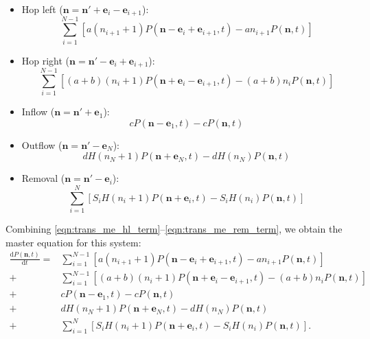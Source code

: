 \documentclass[a4paper,11pt]{article}
\numberwithin{equation}{section}
\newcommand{\diff}[2]{\frac{\mathrm{d} #1}{\mathrm{d} #2}}
\newcommand{\V}[1]{\mathbf{#1}}
\begin{document}
\begin{itemize}
    \item Hop left (\(\V{n} = \V{n}' + \V{e}_i - \V{e}_{i+1}\)):
        \begin{equation}
            \label{eqn:trans_me_hl_term}
            \sum_{i=1}^{N-1} \left[a(n_{i+1}+1) P(\V{n} - \V{e}_i +
                \V{e}_{i+1},t) - a n_{i+1} P(\V{n},t) \right]
        \end{equation}
    \item Hop right (\(\V{n} = \V{n}' - \V{e}_i + \V{e}_{i+1}\)):
        \begin{equation}
            \label{eqn:trans_me_hr_term}
            \sum_{i=1}^{N-1} \left[(a+b)(n_i+1) P(\V{n} + \V{e}_i -
                \V{e}_{i+1},t) - (a+b)n_i P(\V{n},t) \right]
        \end{equation}
    \item Inflow (\(\V{n} = \V{n}' + \V{e}_1\)):
        \begin{equation}
            \label{eqn:trans_me_in_term}
            cP(\V{n} - \V{e}_1,t) - c P(\V{n},t)
        \end{equation}
    \item Outflow (\(\V{n} = \V{n}' - \V{e}_N\)):
        \begin{equation}
            \label{eqn:trans_me_out_term}
            d H(n_N + 1) P(\V{n} + \V{e}_N,t) - d H(n_N) P(\V{n},t)
        \end{equation}
    \item Removal (\(\V{n} = \V{n}' - \V{e}_i\)):
        \begin{equation}
            \label{eqn:trans_me_rem_term}
            \sum_{i=1}^N \left[ S_i H(n_i + 1) P(\V{n} + \V{e}_i,t) - S_i H(n_i) P(\V{n},t)
                \right]
        \end{equation}
\end{itemize}

Combining \eqref{eqn:trans_me_hl_term}--\eqref{eqn:trans_me_rem_term}, we
obtain the master equation for this system:
\begin{equation}
    \label{eqn:trans_me}
    \begin{split}
        \diff{P(\V{n},t)}{t} = &
            \sum_{i=1}^{N-1} \left[a(n_{i+1}+1) P(\V{n} - \V{e}_i +
                \V{e}_{i+1},t) - a n_{i+1} P(\V{n},t) \right]\\
            +&\sum_{i=1}^{N-1} \left[(a+b)(n_i+1) P(\V{n} + \V{e}_i -
                \V{e}_{i+1},t) - (a+b)n_i P(\V{n},t) \right]\\
            +&cP(\V{n} - \V{e}_1,t) - c P(\V{n},t)\\
            +&d H(n_N + 1) P(\V{n} + \V{e}_N,t) - d H(n_N) P(\V{n},t)\\
            +&\sum_{i=1}^N \left[ S_i H(n_i + 1) P(\V{n} + \V{e}_i,t) - S_i
                H(n_i) P(\V{n},t)
                \right].
    \end{split}
\end{equation}
\end{document}

